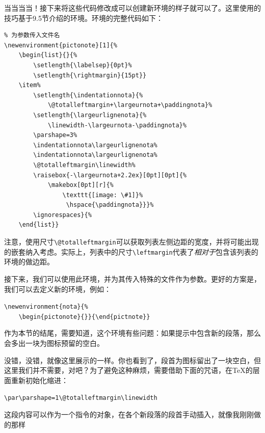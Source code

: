 当当当当！接下来将这些代码修改成可以创建新环境的样子就可以了。这里使用的技巧基于9.5节介绍的环境。环境的完整代码如下：

\begin{dmd}
\begin{verbatim}
% 为参数传入文件名
\newenvironment{pictonote}[1]{% 
    \begin{list}{}{%
        \setlength{\labelsep}{0pt}%
        \setlength{\rightmargin}{15pt}} 
    \item%
        \setlength{\indentationnota}{% 
            \@totalleftmargin+\largeurnota+\paddingnota}%
        \setlength{\largeurlignenota}{% 
            \linewidth-\largeurnota-\paddingnota}%
        \parshape=3% 
        \indentationnota\largeurlignenota% 
        \indentationnota\largeurlignenota% 
        \@totalleftmargin\linewidth% 
        \raisebox{-\largeurnota+2.2ex}[0pt][0pt]{%
            \makebox[0pt][r]{% 
                \texttt{[image: \#1]}%
                 \hspace{\paddingnota}}}%
        \ignorespaces}{% 
    \end{list}}
\end{verbatim}
\end{dmd}

\begin{exclamation}
注意，使用尺寸\verb|\@totalleftmargin|可以获取列表左侧边距的宽度，并将可能出现的嵌套纳入考虑。实际上，列表中的尺寸\verb|\leftmargin|代表了\emph{相对于}包含该列表的环境的做边距。
\end{exclamation}

接下来，我们可以使用此环境，并为其传入特殊的文件作为参数。更好的方案是，我们可以去定义新的环境，例如：

\begin{dmd}
\verb+\newenvironment{nota}{%+\\
\verb+    \begin{pictonote}{+\verb+}}{\end{pictnote}}+
\end{dmd}

\begin{qquestion}
作为本节的结尾，需要知道，这个环境有些问题：如果提示中包含新的段落，那么会多出一块为图标预留的空白。%

没错，没错，就像这里展示的一样。你也看到了，段首为图标留出了一块空白，但这里我们并不需要，对吧？为了避免这种麻烦，需要借助下面的咒语，在\TeX 的层面重新初始化缩进：

\begin{dmd}
\verb|\par\parshape=1\@totalleftmargin\linewidth|
\end{dmd}

这段内容可以作为一个指令的对象，在各个新段落的段首手动插入，就像我刚刚做的那样\dm{:-)}
\end{qquestion}


